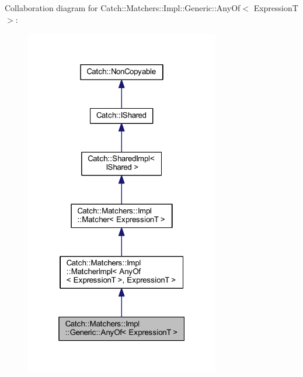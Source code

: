 Collaboration diagram for Catch\+:\+:Matchers\+:\+:Impl\+:\+:Generic\+:\+:Any\+Of$<$ ExpressionT $>$\+:\nopagebreak
\begin{figure}[H]
\begin{center}
\leavevmode
\includegraphics[width=241pt]{class_catch_1_1_matchers_1_1_impl_1_1_generic_1_1_any_of__coll__graph}
\end{center}
\end{figure}

